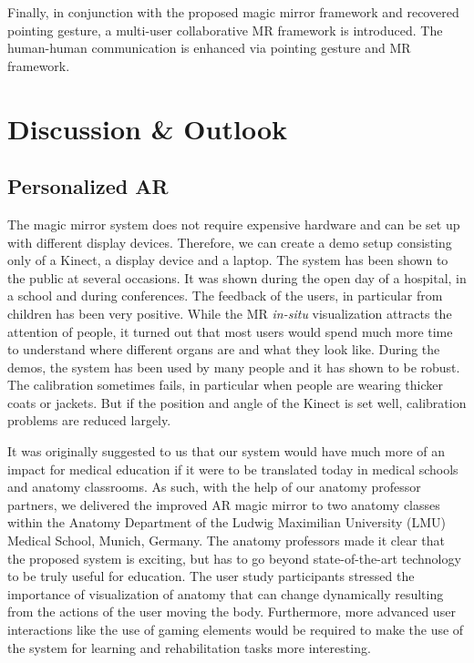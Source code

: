 Finally, in conjunction with the proposed magic mirror framework and recovered pointing gesture, a multi-user collaborative MR framework is introduced. The human-human communication is enhanced via pointing gesture and MR framework. 

\newpage
\section{Discussion \& Outlook}
\subsection{Personalized AR}
The magic mirror system does not require expensive hardware and can be set up with different display devices. Therefore, we can create a demo setup consisting only of a Kinect, a display device and a laptop. The system has been shown to the public at several occasions. It was shown during the open day of a hospital, in a school and during conferences. The feedback of the users, in particular from children has been very positive. While the MR \textit{in-situ} visualization attracts the attention of people, it turned out that most users would spend much more time to understand where different organs are and what they look like. During the demos, the system has been used by many people and it has shown to be robust. The calibration sometimes fails, in particular when people are wearing thicker coats or jackets. But if the position and angle of the Kinect is set well, calibration problems are reduced largely. 

It was originally suggested to us that our system would have much more of an impact for medical education if it were to be translated today in medical schools and anatomy classrooms. 
As such, with the help of our anatomy professor partners, we delivered the improved AR magic mirror to two anatomy classes within the Anatomy Department of the Ludwig Maximilian University (LMU) Medical School, Munich, Germany. 
The anatomy professors made it clear that the proposed system is exciting, but has to go beyond state-of-the-art technology to be truly useful for education. 
The user study participants stressed the importance of visualization of anatomy that can change dynamically resulting from the actions of the user moving the body. 
Furthermore, more advanced user interactions like the use of gaming elements would be required to make the use of the system for learning and rehabilitation tasks more interesting.

